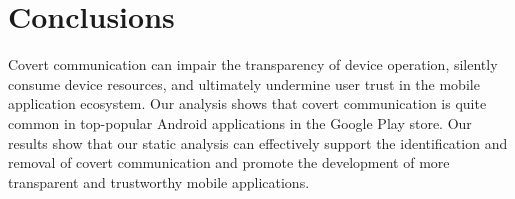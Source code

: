 \vspace{-0.1in}
\section{Conclusions}
\label{sec:conclusions}

Covert communication can impair the transparency of device
operation, silently consume device resources, and ultimately undermine
user trust in the mobile application ecosystem. Our analysis shows
that covert communication is quite common in 
top-popular Android applications in the Google Play store. 
Our results show that our static analysis can effectively 
support the identification and removal of
covert communication and promote the development of more
transparent and trustworthy mobile applications. 
